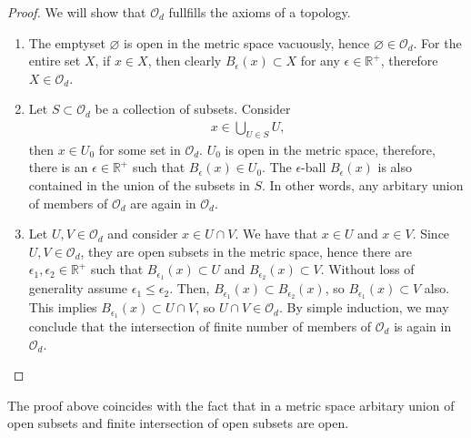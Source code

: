 \begin{proof}
    We will show that \(\mathcal{O}_d\) fullfills the axioms of a topology.
    \begin{enumerate}
        \item The emptyset \(\varnothing\) is open in the metric space vacuously, hence \(\varnothing \in \mathcal{O}_d\). For the entire set \(X\), if \(x \in X\), then clearly \(B_\epsilon(x) \subset X\) for any \(\epsilon \in \mathbb{R}^+\), therefore \(X \in \mathcal{O}_d\).
        \item Let \(S \subset \mathcal{O}_d\) be a collection of subsets. Consider
        \begin{align*}
            x \in \bigcup_{U \in S} U \text{,}
        \end{align*}
        then \(x \in U_0\) for some set in \(\mathcal{O}_d\). \(U_0\) is open in the metric space, therefore, there is an \(\epsilon \in \mathbb{R}^+\) such that \(B_\epsilon(x) \in U_0\). The \(\epsilon\)-ball \(B_\epsilon(x)\) is also contained in the union of the subsets in \(S\). In other words, any arbitary union of members of \(\mathcal{O}_d\) are again in \(\mathcal{O}_d\).
        \item Let \(U, V \in \mathcal{O}_d\) and consider \(x \in U \cap V\). We have that \(x \in U\) and \(x \in V\). Since \(U, V \in \mathcal{O}_d\), they are open subsets in the metric space, hence there are \(\epsilon_1, \epsilon_2 \in \mathbb{R}^+\) such that \(B_{\epsilon_1}(x) \subset U\) and \(B_{\epsilon_2}(x) \subset V\). Without loss of generality assume \(\epsilon_1 \leq \epsilon_2\). Then, \(B_{\epsilon_1}(x) \subset B_{\epsilon_2}(x)\), so \(B_{\epsilon_1}(x) \subset V\) also. This implies \(B_{\epsilon_1}(x) \subset U \cap V\), so \(U \cap V \in \mathcal{O}_d\). By simple induction, we may conclude that the intersection of finite number of members of \(\mathcal{O}_d\) is again in \(\mathcal{O}_d\).
    \end{enumerate}
\end{proof}

\begin{rembox}
    \begin{remark}
        The proof above coincides with the fact that in a metric space arbitary union of open subsets and finite intersection of open subsets are open.
    \end{remark}
\end{rembox}

